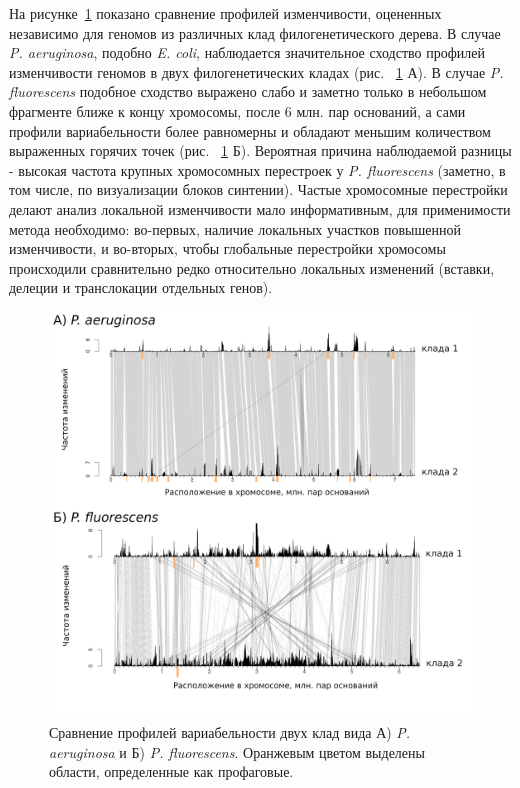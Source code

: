 На рисунке~\ref{img:pseudo_complexity} показано сравнение профилей изменчивости, оцененных независимо для геномов из различных клад филогенетического дерева. В случае \textit{P. aeruginosa}, подобно \textit{E. coli}, наблюдается значительное сходство профилей изменчивости геномов в двух филогенетических кладах (рис. ~\ref{img:pseudo_complexity} А). В случае \textit{P. fluorescens} подобное сходство выражено слабо и заметно только в небольшом фрагменте ближе к концу хромосомы, после 6 млн. пар оснований, а сами профили вариабельности более равномерны и обладают меньшим количеством выраженных горячих точек (рис. ~\ref{img:pseudo_complexity} Б). Вероятная причина наблюдаемой разницы - высокая частота крупных хромосомных перестроек у \textit{P. fluorescens} (заметно, в том числе, по визуализации блоков синтении). Частые хромосомные перестройки делают анализ локальной изменчивости мало информативным, для применимости метода необходимо: во-первых, наличие локальных участков повышенной изменчивости, и во-вторых, чтобы глобальные перестройки хромосомы происходили сравнительно редко относительно локальных изменений (вставки, делеции и транслокации отдельных генов).

\begin{figure}[!ht] 
  \center
    \includegraphics[width=\textwidth]{Dissertation/images/complexity/pseudo_complexity.png}
  \caption{Сравнение профилей вариабельности двух клад вида  А) \textit{P. aeruginosa} и Б) \textit{P. fluorescens}. Оранжевым цветом выделены области, определенные как профаговые.}
  \label{img:pseudo_complexity} 
\end{figure}

